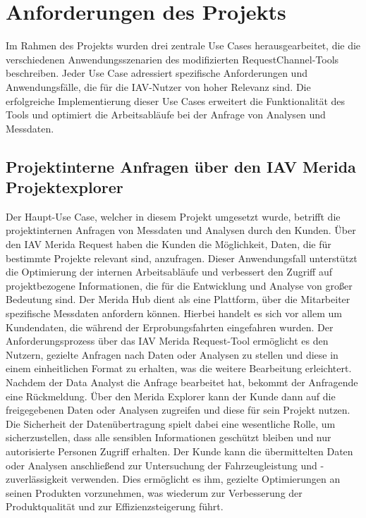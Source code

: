 \chapter{Anforderungen des Projekts}

Im Rahmen des Projekts wurden drei zentrale Use Cases herausgearbeitet, die die verschiedenen Anwendungsszenarien des modifizierten RequestChannel-Tools beschreiben. Jeder Use Case adressiert spezifische Anforderungen und Anwendungsfälle, die für die IAV-Nutzer von hoher Relevanz sind. Die erfolgreiche Implementierung dieser Use Cases erweitert die Funktionalität des Tools und optimiert die Arbeitsabläufe bei der Anfrage von Analysen und Messdaten.
\section{Projektinterne Anfragen über den IAV Merida Projektexplorer}
Der Haupt-Use Case, welcher in diesem Projekt umgesetzt wurde, betrifft die projektinternen Anfragen von Messdaten und Analysen durch den Kunden. Über den IAV Merida Request haben die Kunden die Möglichkeit, Daten, die für bestimmte Projekte relevant sind, anzufragen. Dieser Anwendungsfall unterstützt die Optimierung der internen Arbeitsabläufe und verbessert den Zugriff auf projektbezogene Informationen, die für die Entwicklung und Analyse von großer Bedeutung sind.
\newline
Der Merida Hub dient als eine Plattform, über die Mitarbeiter spezifische Messdaten anfordern können. Hierbei handelt es sich vor allem um Kundendaten, die während der Erprobungsfahrten eingefahren wurden. Der Anforderungsprozess über das IAV Merida Request-Tool ermöglicht es den Nutzern, gezielte Anfragen nach Daten oder Analysen zu stellen und diese in einem einheitlichen Format zu erhalten, was die weitere Bearbeitung erleichtert.
\newline
Nachdem der Data Analyst die Anfrage bearbeitet hat, bekommt der Anfragende eine Rückmeldung. Über den Merida Explorer kann der Kunde dann auf die freigegebenen Daten oder Analysen zugreifen und diese für sein Projekt nutzen. Die Sicherheit der Datenübertragung spielt dabei eine wesentliche Rolle, um sicherzustellen, dass alle sensiblen Informationen geschützt bleiben und nur autorisierte Personen Zugriff erhalten.
\newline
Der Kunde kann die übermittelten Daten oder Analysen anschließend zur Untersuchung der Fahrzeugleistung und -zuverlässigkeit verwenden. Dies ermöglicht es ihm, gezielte Optimierungen an seinen Produkten vorzunehmen, was wiederum zur Verbesserung der Produktqualität und zur Effizienzsteigerung führt.
